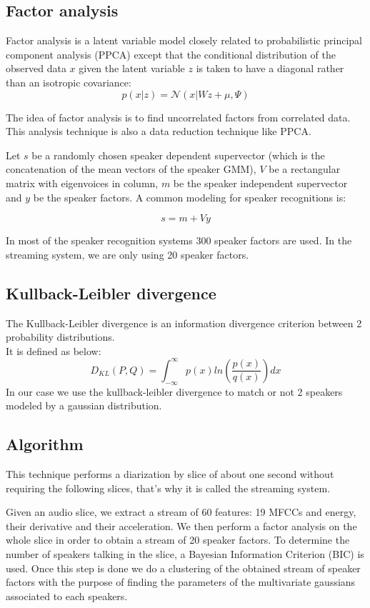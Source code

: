 \documentclass{techrep} %
\begin{document}
\subsection{Factor analysis}

Factor analysis is a latent variable model closely related to
probabilistic principal component analysis (PPCA) except that the
conditional distribution of the observed data $x$ given the latent
variable $z$ is taken to have a diagonal rather than an isotropic
covariance:
$$p(x|z) = \mathcal{N}(x|Wz + \mu, \Psi)$$

The idea of factor analysis is to find uncorrelated factors from
correlated data. This analysis technique is also a data reduction
technique like PPCA.  

Let $s$ be a randomly chosen speaker dependent supervector (which is
the concatenation of the mean vectors of the speaker GMM), $V$ be a
rectangular matrix with eigenvoices in column, $m$ be the speaker
independent supervector and $y$ be the speaker factors. A common
modeling for speaker recognitions is:

$$ s = m + Vy $$

In most of the speaker recognition systems 300
speaker factors are used. In the streaming system, we are only using
20 speaker factors.

\subsection{Kullback-Leibler divergence}

The Kullback-Leibler divergence is an information divergence criterion
between 2 probability distributions.\\
It is defined as below:
$$D_{KL}(P,Q) = \int_{-\infty}^{\infty}p(x)ln(\frac{p(x)}{q(x)})dx$$
In our case we use the kullback-leibler divergence to match or not 2
speakers modeled by a gaussian distribution.

\subsection{Algorithm}

This technique performs a diarization by slice of about one second
without requiring the following slices, that's why it is called the
streaming system.

Given an audio slice, we extract a stream of 60 features: 19 MFCCs and
energy, their derivative and their acceleration. We then perform a
factor analysis on the whole slice in order to obtain a stream of 20
speaker factors.  To determine the number of speakers talking in the
slice, a Bayesian Information Criterion (BIC) is used.  Once this step
is done we do a clustering of the obtained stream of speaker factors
with the purpose of finding the parameters of the multivariate
gaussians associated to each speakers.
\end{document}
